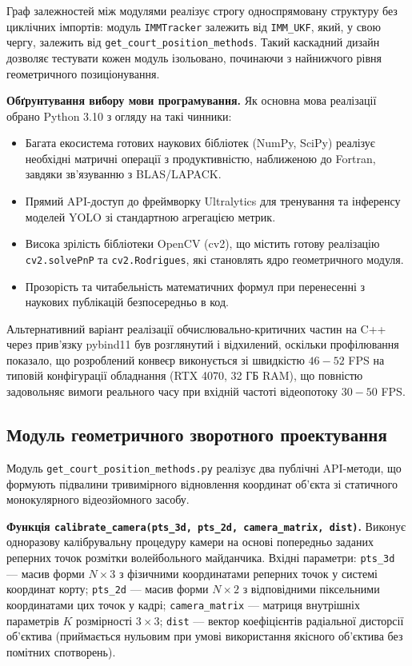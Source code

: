 Граф залежностей між модулями реалізує строгу односпрямовану структуру без циклічних
імпортів: модуль \texttt{IMMTracker} залежить від \texttt{IMM\_UKF}, який, у свою чергу,
залежить від \texttt{get\_court\_position\_methods}. Такий каскадний дизайн дозволяє
тестувати кожен модуль ізольовано, починаючи з найнижчого рівня геометричного
позиціонування.

\textbf{Обґрунтування вибору мови програмування.} Як основна мова реалізації обрано
Python 3.10 з огляду на такі чинники:
\begin{itemize}
    \item Багата екосистема готових наукових бібліотек (NumPy, SciPy) реалізує
    необхідні матричні операції з продуктивністю, наближеною до Fortran, завдяки
    зв'язуванню з BLAS/LAPACK.
    \item Прямий \gls{API}-доступ до фреймворку Ultralytics для тренування та інференсу
    моделей \gls{YOLO} зі стандартною агрегацією метрик.
    \item Висока зрілість бібліотеки OpenCV (cv2), що містить готову реалізацію
    \texttt{cv2.solvePnP} та \texttt{cv2.Rodrigues}, які становлять ядро геометричного
    модуля.
    \item Прозорість та читабельність математичних формул при перенесенні з наукових
    публікацій безпосередньо в код.
\end{itemize}

Альтернативний варіант реалізації обчислювально-критичних частин на C++ через
прив'язку pybind11 був розглянутий і відхилений, оскільки профілювання показало, що
розроблений конвеєр виконується зі швидкістю $46-52$ FPS на типовій конфігурації
обладнання (RTX 4070, 32 ГБ RAM), що повністю задовольняє вимоги реального часу при
вхідній частоті відеопотоку $30-50$ FPS.

\subsection{Модуль геометричного зворотного проектування}

Модуль \texttt{get\_court\_position\_methods.py} реалізує два публічні API-методи, що
формують підвалини тривимірного відновлення координат об'єкта зі статичного
монокулярного відеозйомного засобу.

\textbf{Функція \texttt{calibrate\_camera(pts\_3d, pts\_2d, camera\_matrix, dist)}.}
Виконує одноразову калібрувальну процедуру камери на основі попередньо заданих
реперних точок розмітки волейбольного майданчика. Вхідні параметри:
\texttt{pts\_3d} --- масив форми $N \times 3$ з фізичними координатами реперних
точок у системі координат корту; \texttt{pts\_2d} --- масив форми $N \times 2$ з
відповідними піксельними координатами цих точок у кадрі; \texttt{camera\_matrix} ---
матриця внутрішніх параметрів $K$ розмірності $3 \times 3$; \texttt{dist} --- вектор
коефіцієнтів радіальної дисторсії об'єктива (приймається нульовим при умові
використання якісного об'єктива без помітних спотворень).

